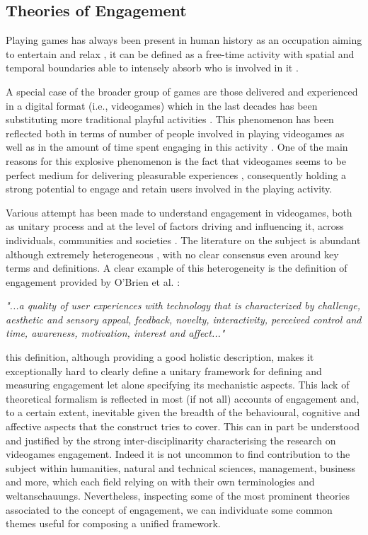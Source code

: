 \subsection{Theories of Engagement}
\label{factors_engagement}
Playing games has always been present in human history as an occupation aiming to entertain and relax \cite{connolly2012systematic}, it can be defined as a free-time activity with spatial and temporal boundaries able to intensely absorb who is involved in it \cite{connolly2012systematic}. 

A special case of the broader group of games are those delivered and experienced in a digital format (i.e., videogames) which in the last decades has been substituting more traditional playful activities \cite{boyle2012engagement,connolly2012systematic}. This phenomenon has been reflected both in terms of number of people involved in playing videogames as well as in the amount of time spent engaging in this activity \cite{boyle2012engagement, zendle2022transnational}. One of the main reasons for this explosive phenomenon is the fact that videogames seems to be perfect medium for delivering pleasurable experiences \cite{boyle2012engagement}, consequently holding a strong potential to engage and retain users involved in the playing activity. 

Various attempt has been made to understand engagement in videogames, both as unitary process and at the level of factors driving and influencing it, across individuals, communities and societies \cite{boyle2012engagement}. The literature on the subject is abundant although extremely heterogeneous \cite{boyle2012engagement}, with no clear consensus even around key terms and definitions. A clear example of this heterogeneity is the definition of engagement provided by O'Brien et al. \cite{o2008user}:

\textit{"...a quality of user experiences with technology that is characterized by challenge, aesthetic and sensory appeal, feedback, novelty, interactivity, perceived control and time, awareness, motivation, interest and affect..."}

this definition, although providing a good holistic description, makes it exceptionally hard to clearly define a unitary framework for defining and measuring engagement let alone specifying its mechanistic aspects. This lack of theoretical formalism is reflected in most (if not all) accounts of engagement and, to a certain extent, inevitable given the breadth of the behavioural, cognitive and affective aspects that the construct tries to cover. This can in part be understood and justified by the strong inter-disciplinarity characterising the research on videogames engagement. Indeed it is not uncommon to find contribution to the subject within humanities, natural and technical sciences, management, business and more, which each field relying on with their own terminologies and weltanschauungs. Nevertheless, inspecting some of the most prominent theories associated to the concept of engagement, we can individuate some common themes useful for composing a unified framework.

